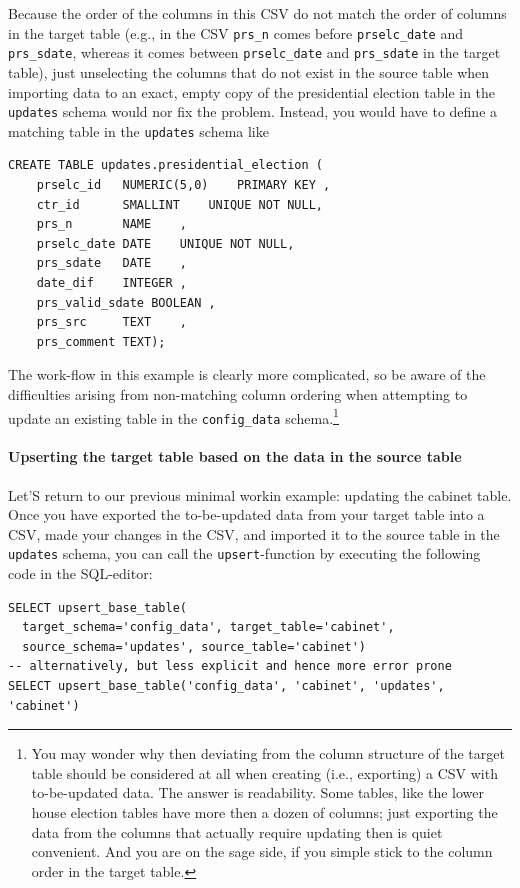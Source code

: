 Because the order of the columns in this CSV do not match the order of columns in the target table (e.g., in the CSV \texttt{prs\_n} comes before \texttt{prselc\_date} and \texttt{prs\_sdate}, whereas it comes between \texttt{prselc\_date} and \texttt{prs\_sdate} in the target table), just unselecting the columns that do not exist in the source table when importing data to an exact, empty copy of the presidential election table in the \texttt{updates} schema would nor fix the problem.
Instead, you would have to define a matching table in the \texttt{updates} schema like
\begin{lstlisting}[language=postgreSQL]
CREATE TABLE updates.presidential_election (
	prselc_id	NUMERIC(5,0)	PRIMARY KEY	,
	ctr_id		SMALLINT	UNIQUE NOT NULL,
	prs_n		NAME	, 
	prselc_date	DATE	UNIQUE NOT NULL,
	prs_sdate	DATE	, 
	date_dif	INTEGER	,
	prs_valid_sdate	BOOLEAN	,
	prs_src		TEXT	, 
	prs_comment	TEXT);
\end{lstlisting}

The work-flow in this example is clearly more complicated, so be aware of the difficulties arising from non-matching column ordering when attempting to update an existing table in the \texttt{config\_data} schema.\footnote{You may wonder why then deviating from the column structure of the target table should be considered at all when creating (i.e., exporting) a CSV with to-be-updated data. 
The answer is readability. Some tables, like the lower house election tables have more then a dozen of columns; just exporting the data from the columns that actually require updating then is quiet convenient. And you are on the sage side, if you simple stick to the column order in the target table.}

\paragraph{Upserting the target table based on the data in the source table}
Let'S return to our previous minimal workin example: updating the cabinet table.
Once you have exported the to-be-updated data from your target table into a CSV, made your changes in the CSV, and imported it to the source table in the \texttt{updates} schema, you can call the \texttt{upsert}-function by executing the following code in the SQL-editor:

\begin{lstlisting}[language=postgreSQL]
SELECT upsert_base_table(
  target_schema='config_data', target_table='cabinet',
  source_schema='updates', source_table='cabinet')
-- alternatively, but less explicit and hence more error prone
SELECT upsert_base_table('config_data', 'cabinet', 'updates', 'cabinet')
\end{lstlisting}


